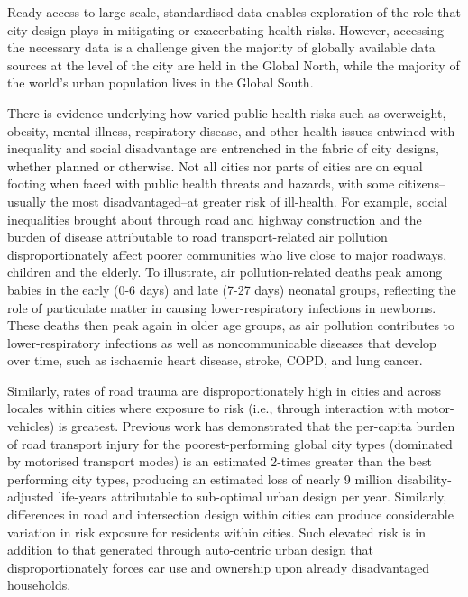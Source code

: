 \documentclass[preprint,12pt]{elsarticle}
\begin{document}
Ready access to large-scale, standardised data enables exploration of the role that city design plays in mitigating or exacerbating health risks. However, accessing the necessary data is a challenge given the majority of globally available data sources at the level of the city are held in the Global North, while the majority of the world's urban population lives in the Global South\cite{Smit2021}.

There is evidence underlying  how varied public health risks such as overweight, obesity, mental illness, respiratory disease, and other health issues entwined with inequality and social disadvantage are entrenched in the fabric of city designs, whether planned or otherwise\cite{borrell2013factors,xing2016impact,yuchi2020road}. Not all cities nor parts of cities are on equal footing when faced with public health threats and hazards, with some citizens--usually the most disadvantaged--at greater risk of ill-health\cite{KRISHNA2021102046}. For example, social inequalities brought about through road and highway construction\cite{carpenter2010poverty,archer2020white} and the burden of disease attributable to road transport-related air pollution disproportionately affect poorer communities who live close to major roadways, children and the elderly. To illustrate, air pollution-related deaths peak among babies in the early (0-6 days) and late (7-27 days) neonatal groups, reflecting the role of particulate matter in causing lower-respiratory infections in newborns. These deaths then peak again in older age groups, as air pollution contributes to lower-respiratory infections as well as noncommunicable diseases that develop over time, such as ischaemic heart disease, stroke, COPD, and lung cancer\cite{boogaard2022long}. 

Similarly, rates of road trauma are disproportionately high in cities and across locales within  cities where exposure to risk (i.e., through interaction with motor-vehicles) is greatest. Previous work has demonstrated that the per-capita burden of road transport injury for the poorest-performing global city types (dominated by motorised transport modes) is an estimated 2-times greater than the best performing city types, producing an estimated loss of nearly 9 million disability-adjusted life-years attributable to sub-optimal urban design per year\cite{Thompson2020}. Similarly, differences in road and intersection design within cities can produce considerable variation in risk exposure for residents within cities\cite{Wijnands_IntersectionDesign2021,MORRISON2019123}. Such elevated risk is in addition to that generated through auto-centric urban design that disproportionately forces car use and ownership upon already disadvantaged households\cite{currie2018alarming, CURL201861}. 
\end{document}
